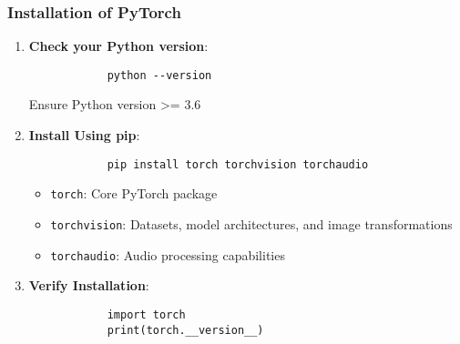 \documentclass{beamer}
\begin{document}
\begin{frame}[fragile]
    \frametitle{Installation of PyTorch}
    \begin{enumerate}
        \item \textbf{Check your Python version}:
            \begin{lstlisting}
            python --version
            \end{lstlisting}
            Ensure Python version >= 3.6
        \item \textbf{Install Using pip}:
            \begin{lstlisting}
            pip install torch torchvision torchaudio
            \end{lstlisting}
            \begin{itemize}
                \item \texttt{torch}: Core PyTorch package
                \item \texttt{torchvision}: Datasets, model architectures, and image transformations
                \item \texttt{torchaudio}: Audio processing capabilities
            \end{itemize}
        \item \textbf{Verify Installation}:
            \begin{lstlisting}
            import torch
            print(torch.__version__)
            \end{lstlisting}
    \end{enumerate}
\end{frame}
\end{document}
